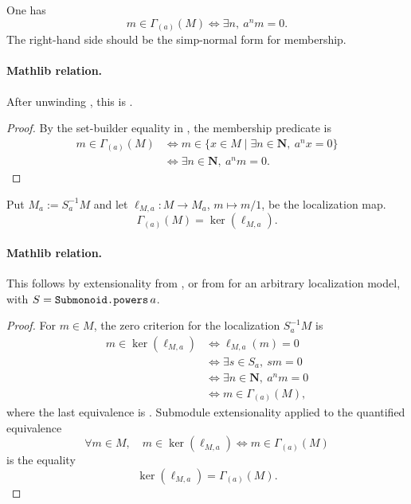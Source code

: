 \begin{lemma}
  \label{lemma:nagata-mem-power-torsion}
  \lean{}

  One has
  \[
    m\in\Gamma_{(a)}(M)
      \Longleftrightarrow
    \exists n,\ a^nm=0.
  \]
  The right-hand side should be the simp-normal form for membership.

  \paragraph{Mathlib relation.}
  After unwinding \texttt{}, this is
  \texttt{}.
\end{lemma}

\begin{proof}
  By the set-builder equality in , the
  membership predicate is
  \[
  \begin{aligned}
    m\in\Gamma_{(a)}(M)
      &\Longleftrightarrow
        m\in\{x\in M\mid\exists n\in\mathbf N,\ a^nx=0\}\\
      &\Longleftrightarrow
        \exists n\in\mathbf N,\ a^nm=0.
  \end{aligned}
  \]
\end{proof}

\begin{lemma}
  \label{lemma:nagata-power-torsion-kernel-localization}
  \lean{}

  Put $M_a:=S_a^{-1}M$ and let
  $\ell_{M,a}\colon M\to M_a$, $m\mapsto m/1$, be the localization map.
  \[
    \Gamma_{(a)}(M)=\ker(\ell_{M,a}).
  \]

  \paragraph{Mathlib relation.}
  This follows by extensionality from
  \texttt{}, or from
  \texttt{} for an arbitrary
  localization model, with
  $S=\texttt{\detokenize{Submonoid.powers}}\,a$.
\end{lemma}

\begin{proof}
  For $m\in M$, the zero criterion for the localization $S_a^{-1}M$ is
  \[
  \begin{aligned}
    m\in\ker(\ell_{M,a})
      &\Longleftrightarrow \ell_{M,a}(m)=0\\
      &\Longleftrightarrow \exists s\in S_a,\ sm=0\\
      &\Longleftrightarrow \exists n\in\mathbf N,\ a^nm=0\\
      &\Longleftrightarrow m\in\Gamma_{(a)}(M),
  \end{aligned}
  \]
  where the last equivalence is
  .  Submodule extensionality applied to
  the quantified equivalence
  \[
    \forall m\in M,\quad
    m\in\ker(\ell_{M,a})
      \Longleftrightarrow m\in\Gamma_{(a)}(M)
  \]
  is the equality
  \[
    \ker(\ell_{M,a})=\Gamma_{(a)}(M).
  \]
\end{proof}


